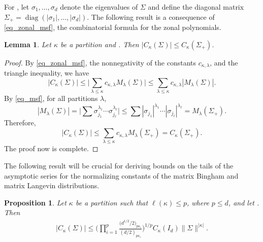 \documentclass[11pt]{article}
\numberwithin{equation}{section}
\numberwithin{equation}{section}
\newtheorem{Lemma}[Theorem]{Lemma}
\newtheorem{Proposition}[Theorem]{Proposition}
 { \theoremstyle{definition}
\newtheorem{Definition}[Theorem]{Definition}
\newtheorem{Note}[Theorem]{Note}
\newtheorem{Example}[Theorem]{Example}
\newtheorem{Remark}[Theorem]{Remark} }
\def\R {\mathbb{R}}
\def\diag{\mathop{\mathrm{diag}}}
\newcommand{\sym}{{{\hskip-1pt}\mathop{\mathrm{sym}}}}
\begin{document}
For \smash{$\Sigma \in \R^{d \times d}_\sym$}, let $\sigma_1,\ldots,\sigma_d$ denote the eigenvalues of $\Sigma$ and define the diagonal matrix $\Sigma_+ = \diag(|\sigma_1|,\ldots,|\sigma_d|)$. The following result is a consequence of \eqref{eq_zonal_msf}, the combinatorial formula for the zonal polynomials.

\begin{Lemma}
\label{lem_zonal_psd}
Let $\kappa$ be a partition and \smash{$\Sigma \in \R^{d \times d}_\sym$}. Then $|C_\kappa(\Sigma)| \le C_\kappa(\Sigma_+)$.
\end{Lemma}

\begin{proof}
By \eqref{eq_zonal_msf}, the nonnegativity of the constants $c_{\kappa,\lambda}$, and the triangle inequality, we have
\[
|C_\kappa(\Sigma)| \le \boldsymbol{\bigg|}\sum_{\lambda \le \kappa} c_{\kappa,\lambda} M_\lambda(\Sigma)\boldsymbol{\bigg|}
\le \sum_{\lambda \le \kappa} c_{\kappa,\lambda} |M_\lambda(\Sigma)|.
\]
By \eqref{eq_msf}, for all partitions $\lambda$,
\[
|M_\lambda(\Sigma)| = \boldsymbol{\Big|}\sum \sigma_{j_1}^{\lambda_1} \cdots \sigma_{j_\ell}^{\lambda_\ell}\boldsymbol{\Big|}
\le \sum |\sigma_{j_1}|^{\lambda_1} \cdots |\sigma_{j_\ell}|^{\lambda_\ell}
= M_\lambda(\Sigma_+).
\]
Therefore, \[
|C_\kappa(\Sigma)| \le \sum_{\lambda \le \kappa} c_{\kappa,\lambda} M_\lambda(\Sigma_+) =
C_\kappa(\Sigma_+).
\]
The proof now is complete.
\end{proof}



The following result will be crucial for deriving bounds on the tails of the asymptotic series for the normalizing constants of the matrix Bingham and matrix Langevin distributions.

\begin{Proposition}
\label{prop_zonal_bound}
Let $\kappa$ be a partition such that $\ell(\kappa) \le p$, where $p \le d$, and let \smash{$\Sigma \in \R^{d \times d}_\sym$}. Then
\begin{gather}
\label{eq_zonal_bound}
|C_\kappa(\Sigma)| \le \Bigg(\prod_{i=1}^p \frac{\bigl(d^{1/2}/2\bigr)_{p \kappa_i}}{(d/2)_{p \kappa_i}}\Bigg)^{1/p} C_\kappa(I_d) \|\Sigma\|^{|\kappa|}.
\end{gather}
\end{Proposition}
\end{document}
